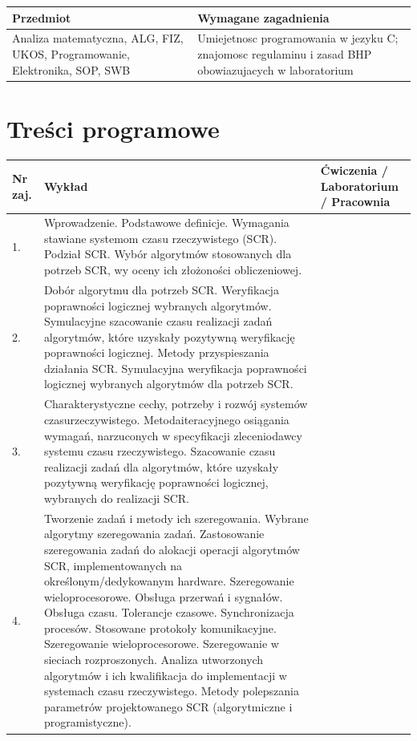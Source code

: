 \documentclass[12pt, a4paper]{article}
\begin{document}
\begin{tabularx}{\textwidth}{lX}
  \hline
  \textbf{Przedmiot} & \textbf{Wymagane zagadnienia} \\
  \hline
  Analiza matematyczna, ALG, FIZ, UKOS, Programowanie, Elektronika, SOP, SWB & Umiejetnosc programowania w jezyku C; znajomosc regulaminu i zasad BHP obowiazujacych w laboratorium \\
  \hline
\end{tabularx}

\section{Treści programowe}

\begin{longtable}{|p{1.5cm}|p{6.5cm}|p{6.5cm}|}
\hline
\textbf{Nr zaj.} & \textbf{Wykład} & \textbf{Ćwiczenia / Laboratorium / Pracownia} \\\hline
\endhead
  \hline
  1. & Wprowadzenie. Podstawowe definicje. Wymagania stawiane systemom czasu rzeczywistego (SCR). Podział SCR. Wybór algorytmów stosowanych dla potrzeb SCR, wy oceny ich złożoności obliczeniowej. &  \\
  \hline
  2. & Dobór algorytmu dla potrzeb SCR. Weryfikacja poprawności logicznej wybranych algorytmów. Symulacyjne szacowanie czasu realizacji zadań algorytmów, które uzyskały pozytywną weryfikację poprawności logicznej.  Metody przyspieszania działania SCR. Symulacyjna weryfikacja poprawności logicznej wybranych algorytmów dla potrzeb SCR. &  \\
  \hline
  3. & Charakterystyczne cechy, potrzeby i rozwój systemów czasurzeczywistego. Metodaiteracyjnego osiągania wymagań, narzuconych w specyfikacji zleceniodawcy systemu czasu rzeczywistego. Szacowanie czasu realizacji zadań dla algorytmów,  które uzyskały pozytywną weryfikację poprawności logicznej, wybranych do realizacji SCR. &  \\
  \hline
  4. & Tworzenie zadań i metody ich szeregowania. Wybrane algorytmy szeregowania zadań. Zastosowanie szeregowania zadań do alokacji operacji algorytmów SCR, implementowanych na określonym/dedykowanym hardware. Szeregowanie wieloprocesorowe. Obsługa przerwań i sygnałów. Obsługa czasu.  Tolerancje czasowe. Synchronizacja procesów.  Stosowane protokoły komunikacyjne. Szeregowanie wieloprocesorowe. Szeregowanie w sieciach rozproszonych. Analiza utworzonych algorytmów i ich kwalifikacja do implementacji w systemach czasu rzeczywistego. Metody polepszania parametrów projektowanego SCR (algorytmiczne i programistyczne). &  \\

\end{longtable}
\end{document}
